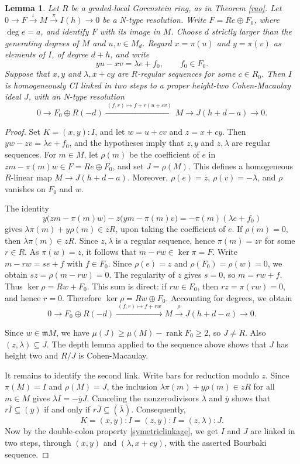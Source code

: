 \documentclass[11pt,letterpaper]{amsart}
\newcommand{\seq}{\subseteq}
\newcommand{\x}{\xrightarrow{}}
\theoremstyle{plain}
\newtheorem{lem}[thm]{Lemma}
\theoremstyle{definition}
\theoremstyle{remark}
\begin{document}
\begin{lem}\label{lem:replace} Let $R$ be a graded-local Gorenstein ring, as in Theorem \ref{rao}. Let $0\to F\xrightarrow{\iota}M\xrightarrow{\pi}I(h)\to0$ be a N-type resolution. Write $F=Re\oplus F_0$, where $\deg e=a$, and identify $F$ with its image in $M$. Choose $d$ strictly larger than the generating degrees of $M$ and $u,v\in M_d$. Regard $x=\pi(u)$ and $y=\pi(v)$ as elements of $I$, of degree $d+h$, and write
\[
yu-xv=\lambda e+f_0,\qquad f_0\in F_0.
\]
Suppose that $x,y$ and $\lambda,x+cy$ are $R$-regular sequences for some $c\in R_0$. Then $I$ is homogeneously CI linked in two steps to a proper height-two Cohen-Macaulay ideal $J$, with an N-type resolution
\[
0\longrightarrow F_0\oplus R(-d)
\xrightarrow{\ (f,r)\mapsto f+r(u+cv)\ }
M\longrightarrow J(h+d-a)\longrightarrow0.
\]
\end{lem}
\begin{proof}
Set $K=(x,y):I$, and let $w=u+cv$ and $z=x+cy$. Then $yw-zv=\lambda e+f_0$,
and the hypotheses imply that $z,y$ and $z,\lambda$ are regular
sequences. For $m\in M$, let $\rho(m)$ be the coefficient of $e$
in $zm-\pi(m)w\in F=Re\oplus F_0$, and set $J=\rho(M)$.
This defines a homogeneous $R$-linear map $M\x J(h+d-a)$.
Moreover, $\rho(e)=z$, $\rho(v)=-\lambda$, and $\rho$ vanishes
on $F_0$ and $w$.

The identity
\[
y\bigl(zm-\pi(m)w\bigr)-z\bigl(ym-\pi(m)v\bigr)
=-\pi(m)(\lambda e+f_0)
\]
gives $\lambda\pi(m)+y\rho(m)\in zR$, upon taking the coefficient
of $e$. If $\rho(m)=0$, then $\lambda\pi(m)\in zR$. Since
$z,\lambda$ is a regular sequence, hence $\pi(m)=zr$ for some $r\in R$.
As $\pi(w)=z$, it follows that $m-rw\in\ker\pi=F$. Write
$m-rw=se+f$ with $f\in F_0$. Since $\rho(e)=z$ and
$\rho(F_0)=\rho(w)=0$, we obtain $sz=\rho(m-rw)=0$. The
regularity of $z$ gives $s=0$, so $m=rw+f$. Thus
$\ker\rho=Rw+F_0$. This sum is direct: if $rw\in F_0$, then
$rz=\pi(rw)=0$, and hence $r=0$. Therefore
$\ker\rho=Rw\oplus F_0$. Accounting for degrees, we obtain
\[
0\longrightarrow F_0\oplus R(-d)
\xrightarrow{\ (f,r)\mapsto f+rw\ }
M\xrightarrow{\rho}J(h+d-a)\longrightarrow0.
\]

Since $w\in\mathfrak mM$, we have
$\mu(J)\ge\mu(M)-\operatorname{rank}F_0\ge2$, so $J\ne R$.
Also $(z,\lambda)\seq J$. The depth lemma applied to the
sequence above shows that $J$ has height two and $R/J$ is
Cohen-Macaulay.

It remains to identify the second link. Write bars for reduction
modulo $z$. Since $\pi(M)=I$ and $\rho(M)=J$, the inclusion
$\lambda\pi(m)+y\rho(m)\in zR$ for all $m\in M$ gives
$\overline{\lambda}\overline{ I}=-\overline{y}\overline{J}$. Canceling the nonzerodivisors
$\overline{\lambda}$ and $\overline{y}$ shows that
$\overline{r}\overline{I}\seq(\overline{y})$ if and only if
$\overline{r}\overline{J}\seq(\overline{\lambda})$. Consequently,
\[
K=(x,y):I=(z,y):I=(z,\lambda):J.
\]
Now by the double-colon property \ref{symetriclinkage}, we get $I$ and $J$ are linked in two steps,
through $(x,y)$ and $(\lambda,x+cy)$, with the asserted
Bourbaki sequence.
\end{proof}
\end{document}
